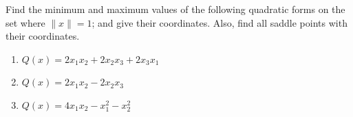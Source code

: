 \begin{enumerate}
\newpage

    \Problem Find the minimum and maximum values of the following quadratic forms on the set where $\|x\| = 1$; and give their coordinates. Also, find all saddle points with their coordinates.
    \begin{enumerate}
        \item $Q(x) = 2x_1x_2 + 2x_2x_3 + 2x_3x_1$\vfill
        \item $Q(x) = 2x_1x_2 - 2x_2x_3$\vfill
        \item $Q(x) = 4x_1x_2 - x_1^2 - x_2^2$\vfill
    \end{enumerate}
\end{enumerate}

